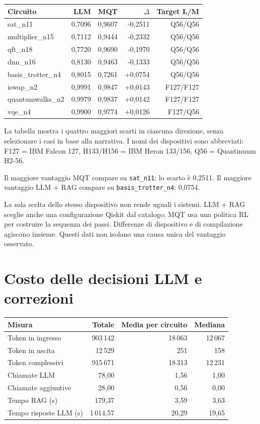 \documentclass[11pt,a4paper]{article}
\begin{document}
\begin{center}
\small
\setlength{\tabcolsep}{5pt}
\begin{tabular}{lrrrr}
\toprule
Circuito & LLM & MQT & $\Delta$ & Target L/M\\
\midrule
sat\_n11 & 0,7096 & 0,9607 & -0,2511 & Q56/Q56\\
multiplier\_n15 & 0,7112 & 0,9444 & -0,2332 & Q56/Q56\\
qft\_n18 & 0,7720 & 0,9690 & -0,1970 & Q56/Q56\\
dnn\_n16 & 0,8130 & 0,9463 & -0,1333 & Q56/Q56\\
basis\_trotter\_n4 & 0,8015 & 0,7261 & +0,0754 & Q56/Q56\\
iswap\_n2 & 0,9991 & 0,9847 & +0,0143 & F127/F127\\
quantumwalks\_n2 & 0,9979 & 0,9837 & +0,0142 & F127/F127\\
vqe\_n4 & 0,9900 & 0,9774 & +0,0126 & F127/Q56\\
\bottomrule
\end{tabular}\end{center}

La tabella mostra i quattro maggiori scarti in ciascuna direzione,
senza selezionare i casi in base alla narrativa. I nomi dei dispositivi sono
abbreviati: F127 = IBM Falcon 127, H133/H156 = IBM Heron 133/156,
Q56 = Quantinuum H2-56.


Il maggiore vantaggio MQT compare su \texttt{sat\_n11}: lo scarto è 0,2511. Il maggiore vantaggio LLM + RAG compare su \texttt{basis\_trotter\_n4}: 0,0754.

La sola scelta dello stesso dispositivo non rende uguali i sistemi.
LLM + RAG sceglie anche una configurazione Qiskit dal catalogo; MQT usa una politica
RL per costruire la sequenza dei passi. Differenze di dispositivo e di compilazione
agiscono insieme. Questi dati non isolano una causa unica del vantaggio osservato.

\clearpage\section{Costo delle decisioni LLM e correzioni}

\begin{center}
\small
\setlength{\tabcolsep}{5pt}
\begin{tabular}{lrrr}
\toprule
Misura & Totale & Media per circuito & Mediana\\
\midrule
Token in ingresso & 903\,142 & 18\,063 & 12\,067\\
Token in uscita & 12\,529 & 251 & 158\\
Token complessivi & 915\,671 & 18\,313 & 12\,231\\
Chiamate LLM & 78,00 & 1,56 & 1,00\\
Chiamate aggiuntive & 28,00 & 0,56 & 0,00\\
Tempo RAG (s) & 179,37 & 3,59 & 3,63\\
Tempo risposte LLM (s) & 1\,014,57 & 20,29 & 19,65\\
\bottomrule
\end{tabular}\end{center}
\end{document}

